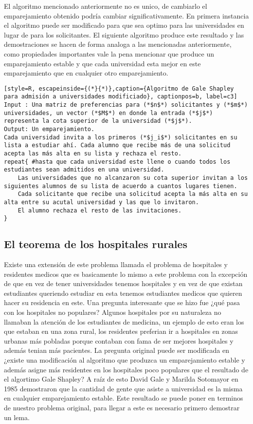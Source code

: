 El algoritmo mencionado anteriormente no es unico, de cambiarlo el emparejamiento obtenido podría cambiar significativamente. En primera instancia el algoritmo puede ser modificado para que sea optimo para las universidades en lugar de para los solicitantes. El siguiente algoritmo produce este resultado y las demostraciones se hacen de forma analoga a las mencionadas anteriormente, como propiedades importantes vale la pena mencionar que produce un emparejamiento estable y que cada universidad esta mejor en este emparejamiento que en cualquier otro emparejamiento. 

\begin{lstlisting}[style=R, escapeinside={(*}{*)},caption={Algoritmo de Gale Shapley para admisión a universidades modificiado}, captionpos=b, label=c3]
Input : Una matriz de preferencias para (*$n$*) solicitantes y (*$m$*) universidades, un vector (*$M$*) en donde la entrada (*$j$*) representa la cota superior de la universidad (*$j$*).
Output: Un emparejamiento. 
Cada universidad invita a los primeros (*$j_i$*) solicitantes en su lista a estudiar ahí. Cada alumno que recibe más de una solicitud acepta las más alta en su lista y rechaza el resto. 
repeat{ #hasta que cada universidad este llene o cuando todos los estudiantes sean admitidos en una universidad.
	Las universidades que no alcanzaron su cota superior invitan a los siguientes alumnos de su lista de acuerdo a cuantos lugares tienen.
	Cada solicitante que recibe una solicitud acepta la más alta en su alta entre su acutal universidad y las que lo invitaron. 
	El alumno rechaza el resto de las invitaciones.
}
\end{lstlisting}

\subsection{El teorema de los hospitales rurales}

Existe una extensión de este problema llamada el problema de hospitales y residentes medicos que es basicamente lo mismo a este problema con la excepción de que en vez de tener universidades tenemos hospitales y en vez de que existan estudiantes queriendo estudiar en esta tenemos estudiantes medicos que quieren hacer su residencia en este. Una pregunta interesante que se hizo fue ¿qué pasa con los hospitales no populares? Algunos hospitales por su naturaleza no llamaban la atención de los estudiantes de medicina, un ejemplo de esto eran los que estaban en una zona rural, los residentes preferian ir a hospitales en zonas urbanas más pobladas porque contaban con fama de ser mejores hospitales y además tenian más pacientes. La pregunta original puede ser modificada en ¿existe una modificación al algoritmo que produzca un emparejamiento estable y además asigne más residentes en los hospitales poco populares que el resultado de el algortimo Gale Shapley? A raíz de esto David Gale y Marilda Sotomayor en 1985 demostraron que la cantidad de gente que asiste a universidad es la misma en cualquier emparejamiento estable. Este resultado se puede poner en terminos de nuestro problema original, para llegar a este es necesario primero demostrar un lema.


